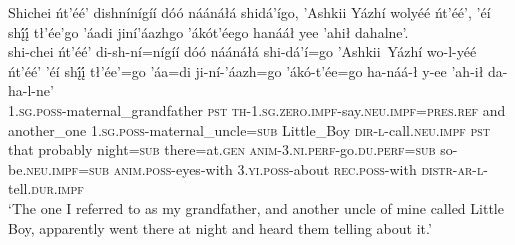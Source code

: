 \ea\label{ex:text1-23-1}
Shichei ńt’éé’ dishnínígíí dóó náánáłá shidá’ígo, ’Ashkii Yázhí wolyéé ńt’éé’, ’éí shį́į́ tł’ée’go ’áadi jiní’áazhgo ’ákót’éego hanááł yee ’ahił dahalne’.\\
\gll shi-chei	ńt’éé’	di-sh-ní=nígíí	dóó	náánáłá	shi-dá’í=go	’Ashkii~{Yázhí}	wo-l-yéé	ńt’éé’	’éí	shį́į́	tł’ée’=go	’áa=di	ji-ní-’áazh=go	’ákó-t’ée=go	ha-náá-ł	y-ee	’ah-ił	da-ha-l-ne’\\
     1.\textsc{sg}.\textsc{poss}-maternal\_grandfather	\textsc{pst}	\textsc{th}-1.\textsc{sg}.\textsc{zero}.\textsc{impf}-say.\textsc{neu}.\textsc{impf}=\textsc{pres}.\textsc{ref}	and	another\_one	1.\textsc{sg}.\textsc{poss}-maternal\_uncle=\textsc{sub}	Little\_Boy	\textsc{dir}-\textsc{l}-call.\textsc{neu}.\textsc{impf}	\textsc{pst}	that	probably	night=\textsc{sub}	there=at.\textsc{gen}	\textsc{anim}-3.\textsc{ni}.\textsc{perf}-go.\textsc{du}.\textsc{perf}=\textsc{sub}	so-be.\textsc{neu}.\textsc{impf}=\textsc{sub}	\textsc{anim}.\textsc{poss}-eyes-with	3.\textsc{yi}.\textsc{poss}-about	\textsc{rec}.\textsc{poss}-with	\textsc{distr}-\textsc{ar}-\textsc{l}-tell.\textsc{dur}.\textsc{impf}\\
\glt `The one I referred to as my grandfather, and another uncle of mine called Little Boy, apparently went there at night and heard them telling about it.'
\z

